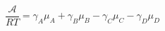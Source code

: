\begin{equation}\label{eqn:reaction-affinity}
\frac{\mathcal{A}}{RT}={{\gamma }_{A}}{{\mu }_{A}}+{{\gamma }_{B}}{{\mu }_{B}}-{{\gamma }_{C}}{{\mu }_{C}}-{{\gamma }_{D}}{{\mu }_{D}}
\end{equation}